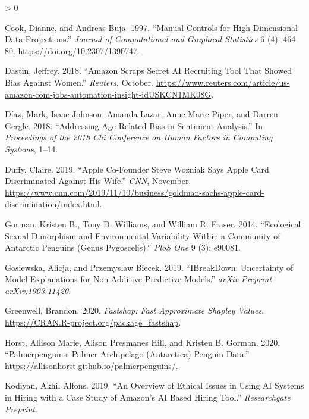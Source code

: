 \documentclass[
]{article}
\newlength{\cslhangindent}
\newenvironment{CSLReferences}[2] %
 {%
  \setlength{\parindent}{0pt}
  \ifodd #1 \everypar{\setlength{\hangindent}{\cslhangindent}}\ignorespaces\fi
  \ifnum #2 > 0
  \setlength{\parskip}{#2\baselineskip}
  \fi
 }%
 {}
\begin{document}
\begin{CSLReferences}{1}{0}
\leavevmode\hypertarget{ref-cook_manual_1997}{}%
Cook, Dianne, and Andreas Buja. 1997. {``Manual {Controls} for {High}-{Dimensional} {Data} {Projections}.''} \emph{Journal of Computational and Graphical Statistics} 6 (4): 464--80. \url{https://doi.org/10.2307/1390747}.

\leavevmode\hypertarget{ref-dastin_amazon_2018}{}%
Dastin, Jeffrey. 2018. {``Amazon Scraps Secret {AI} Recruiting Tool That Showed Bias Against Women.''} \emph{Reuters}, October. \url{https://www.reuters.com/article/us-amazon-com-jobs-automation-insight-idUSKCN1MK08G}.

\leavevmode\hypertarget{ref-diaz_addressing_2018}{}%
Díaz, Mark, Isaac Johnson, Amanda Lazar, Anne Marie Piper, and Darren Gergle. 2018. {``Addressing Age-Related Bias in Sentiment Analysis.''} In \emph{Proceedings of the 2018 Chi Conference on Human Factors in Computing Systems}, 1--14.

\leavevmode\hypertarget{ref-duffy_apple_2019}{}%
Duffy, Claire. 2019. {``Apple Co-Founder {Steve} {Wozniak} Says {Apple} {Card} Discriminated Against His Wife.''} \emph{CNN}, November. \url{https://www.cnn.com/2019/11/10/business/goldman-sachs-apple-card-discrimination/index.html}.

\leavevmode\hypertarget{ref-gorman_ecological_2014}{}%
Gorman, Kristen B., Tony D. Williams, and William R. Fraser. 2014. {``Ecological Sexual Dimorphism and Environmental Variability Within a Community of {Antarctic} Penguins (Genus {Pygoscelis}).''} \emph{PloS One} 9 (3): e90081.

\leavevmode\hypertarget{ref-gosiewska_ibreakdown_2019}{}%
Gosiewska, Alicja, and Przemyslaw Biecek. 2019. {``{IBreakDown}: {Uncertainty} of Model Explanations for Non-Additive Predictive Models.''} \emph{arXiv Preprint arXiv:1903.11420}.

\leavevmode\hypertarget{ref-greenwell_fastshap_2020}{}%
Greenwell, Brandon. 2020. \emph{Fastshap: {Fast} {Approximate} {Shapley} {Values}}. \url{https://CRAN.R-project.org/package=fastshap}.

\leavevmode\hypertarget{ref-horst_palmerpenguins_2020}{}%
Horst, Allison Marie, Alison Presmanes Hill, and Kristen B. Gorman. 2020. {``Palmerpenguins: {Palmer} {Archipelago} ({Antarctica}) Penguin Data.''} \url{https://allisonhorst.github.io/palmerpenguins/}.

\leavevmode\hypertarget{ref-kodiyan_overview_2019}{}%
Kodiyan, Akhil Alfons. 2019. {``An Overview of Ethical Issues in Using {AI} Systems in Hiring with a Case Study of {Amazon}'s {AI} Based Hiring Tool.''} \emph{Researchgate Preprint}.


\end{CSLReferences}
\end{document}
